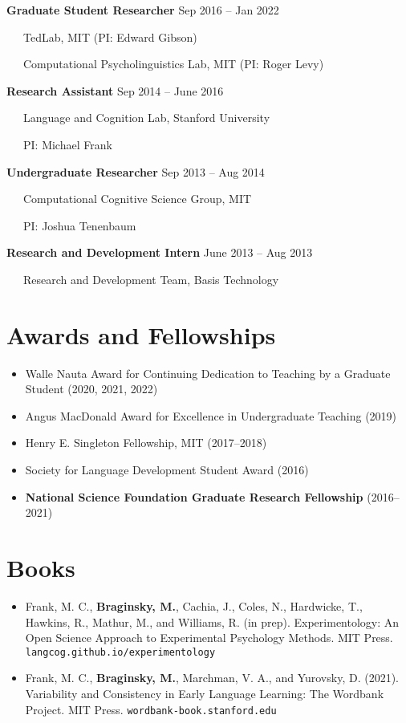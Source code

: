 \documentclass[11pt,]{article}
\providecommand{\tightlist}{%
  \setlength{\itemsep}{0pt}\setlength{\parskip}{0pt}}
\begin{document}
\textbf{Graduate Student Researcher} \hfill Sep 2016 -- Jan 2022\\
\strut ~~~TedLab, MIT (PI: Edward Gibson)\\
\strut ~~~Computational Psycholinguistics Lab, MIT (PI: Roger Levy)

\textbf{Research Assistant} \hfill Sep 2014 -- June 2016\\
\strut ~~~Language and Cognition Lab, Stanford University\\
\strut ~~~PI: Michael Frank

\textbf{Undergraduate Researcher} \hfill Sep 2013 -- Aug 2014\\
\strut ~~~Computational Cognitive Science Group, MIT\\
\strut ~~~PI: Joshua Tenenbaum

\textbf{Research and Development Intern} \hfill June 2013 -- Aug 2013\\
\strut ~~~Research and Development Team, Basis Technology

\section{Awards and Fellowships}\label{awards-and-fellowships}

\begin{itemize}
\tightlist
\item
  Walle Nauta Award for Continuing Dedication to Teaching by a Graduate
  Student (2020, 2021, 2022)
\item
  Angus MacDonald Award for Excellence in Undergraduate Teaching (2019)
\item
  Henry E. Singleton Fellowship, MIT (2017--2018)
\item
  Society for Language Development Student Award (2016)
\item
  \textbf{National Science Foundation Graduate Research Fellowship}
  (2016--2021)
\end{itemize}

\section{Books}\label{books}

\begin{itemize}
\item
  Frank, M. C., \textbf{Braginsky, M.}, Cachia, J., Coles, N.,
  Hardwicke, T., Hawkins, R., Mathur, M., and Williams, R. (in prep).
  Experimentology: An Open Science Approach to Experimental Psychology
  Methods. MIT Press. \texttt{langcog.github.io/experimentology}
\item
  Frank, M. C., \textbf{Braginsky, M.}, Marchman, V. A., and Yurovsky,
  D. (2021). Variability and Consistency in Early Language Learning: The
  Wordbank Project. MIT Press. \texttt{wordbank-book.stanford.edu}
\end{itemize}
\end{document}
